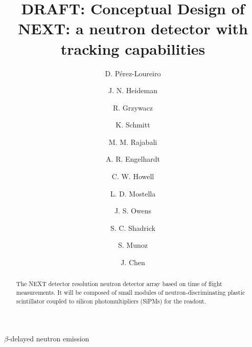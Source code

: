 \documentclass[preprint,3p,twocolumn]{elsarticle}
\begin{document}
\begin{frontmatter}

\title{DRAFT: Conceptual Design of NEXT: a neutron detector with tracking capabilities}


\author[mymainaddress]{D. P\'erez-Loureiro}
\author[mymainaddress]{J. N. Heideman}


\author[mymainaddress,ORNLaddress]{R. Grzywacz}

\author[mymainaddress]{K. Schmitt}

\author[TTUaddress]{M. M. Rajabali}
\author[TTUaddress]{A. R. Engelhardt}
\author[TTUaddress]{C. W. Howell}
\author[TTUaddress]{L. D. Mostella}
\author[TTUaddress]{J. S. Owens}
\author[TTUaddress]{S. C. Shadrick}

\author[JINPAaddress]{S. Munoz}


\author[mymainaddress]{J. Chen}



\address[mymainaddress]{Department of Physics and Astronomy,  University of Tennessee, Knoxville, Tennessee , 37996 USA}
\address[ORNLaddress]{Physics Division, Oak Ridge National Laboratory, Oak Ridge TN 37831 USA}
\address[TTUaddress]{Department of Physics Tennessee Technological University, Cookeville, Tennessee, 38505, USA}
\address[JINPAaddress]{Joint Institute for Nuclear Physics and Applications, Oak Ridge TN 37831 USA}


\begin{abstract}
The NEXT detector  resolution neutron detector array based on time of flight
measurements. It will be composed of small modules of neutron-discriminating plastic scintillator
coupled to silicon photomultipliers (SiPMs) for the readout.
\end{abstract}

\begin{keyword}
$\beta$-delayed neutron emission
\end{keyword}

\end{frontmatter}
\end{document}
